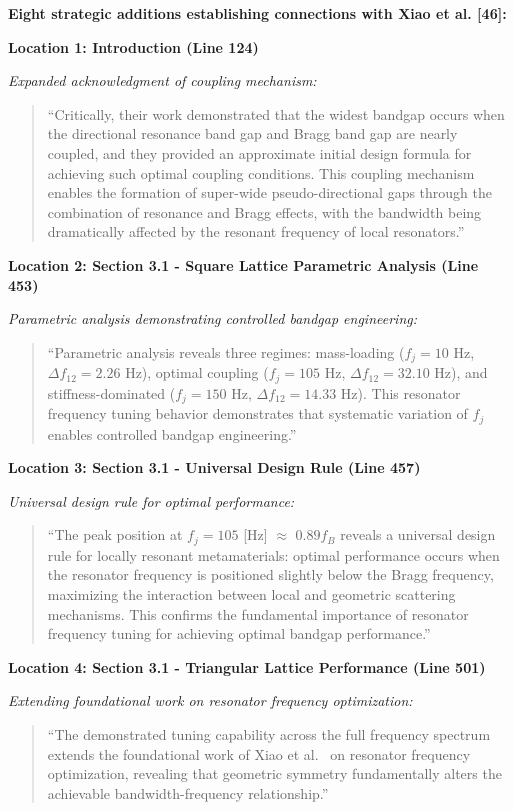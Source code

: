 \documentclass[11pt,a4paper]{article}
\newenvironment{changesbox}{%
    \par\medskip\noindent{\color{changescolor}\rule{\linewidth}{2pt}}\par
    \noindent{\color{changescolor}\bfseries Manuscript Changes}\par\smallskip
}{%
    \par\noindent{\color{changescolor}\rule{\linewidth}{0.5pt}}\medskip
}
\begin{document}
\begin{changesbox}
\textbf{Eight strategic additions establishing connections with Xiao et al. [46]:}

\textbf{Location 1: Introduction (Line 124)}

\textit{Expanded acknowledgment of coupling mechanism:}
\begin{quote}
\textcolor{redtext}{``Critically, their work demonstrated that the widest bandgap occurs when the directional resonance band gap and Bragg band gap are nearly coupled, and they provided an approximate initial design formula for achieving such optimal coupling conditions. This coupling mechanism enables the formation of super-wide pseudo-directional gaps through the combination of resonance and Bragg effects, with the bandwidth being dramatically affected by the resonant frequency of local resonators.''}
\end{quote}

\textbf{Location 2: Section 3.1 - Square Lattice Parametric Analysis (Line 453)}

\textit{Parametric analysis demonstrating controlled bandgap engineering:}
\begin{quote}
\textcolor{redtext}{``Parametric analysis reveals three regimes: mass-loading ($f_j = 10$ Hz, $\Delta f_{12} = 2.26$ Hz), optimal coupling ($f_j = 105$ Hz, $\Delta f_{12} = 32.10$ Hz), and stiffness-dominated ($f_j = 150$ Hz, $\Delta f_{12} = 14.33$ Hz). This resonator frequency tuning behavior demonstrates that systematic variation of $f_j$ enables controlled bandgap engineering.''}
\end{quote}

\textbf{Location 3: Section 3.1 - Universal Design Rule (Line 457)}

\textit{Universal design rule for optimal performance:}
\begin{quote}
\textcolor{redtext}{``The peak position at $f_j = 105$ [Hz] $\approx$ $0.89 f_B$ reveals a universal design rule for locally resonant metamaterials: optimal performance occurs when the resonator frequency is positioned slightly below the Bragg frequency, maximizing the interaction between local and geometric scattering mechanisms. This confirms the fundamental importance of resonator frequency tuning for achieving optimal bandgap performance.''}
\end{quote}

\textbf{Location 4: Section 3.1 - Triangular Lattice Performance (Line 501)}

\textit{Extending foundational work on resonator frequency optimization:}
\begin{quote}
\textcolor{redtext}{``The demonstrated tuning capability across the full frequency spectrum extends the foundational work of Xiao et al.~\cite{Xiao_2012} on resonator frequency optimization, revealing that geometric symmetry fundamentally alters the achievable bandwidth-frequency relationship.''}
\end{quote}


\end{changesbox}
\end{document}
